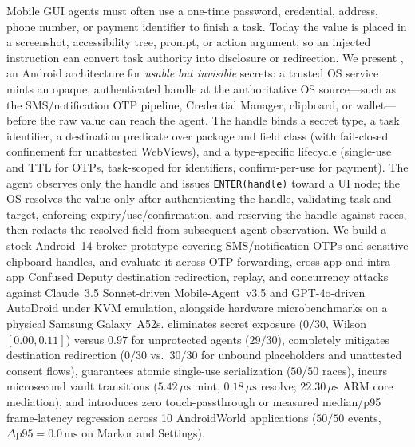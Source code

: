 Mobile GUI agents must often use a one-time password, credential, address, phone number, or payment identifier to finish a task. Today the value is placed in a screenshot, accessibility tree, prompt, or action argument, so an injected instruction can convert task authority into disclosure or redirection. We present \SH, an Android architecture for \emph{usable but invisible} secrets: a trusted OS service mints an opaque, authenticated handle at the authoritative OS source---such as the SMS/notification OTP pipeline, Credential Manager, clipboard, or wallet---before the raw value can reach the agent. The handle binds a secret type, a task identifier, a destination predicate over package and field class (with fail-closed confinement for unattested WebViews), and a type-specific lifecycle (single-use and TTL for OTPs, task-scoped for identifiers, confirm-per-use for payment). The agent observes only the handle and issues \texttt{ENTER(handle)} toward a UI node; the OS resolves the value only after authenticating the handle, validating task and target, enforcing expiry/use/confirmation, and reserving the handle against races, then redacts the resolved field from subsequent agent observation. We build a stock Android~14 broker prototype covering SMS/notification OTPs and sensitive clipboard handles, and evaluate it across OTP forwarding, cross-app and intra-app Confused Deputy destination redirection, replay, and concurrency attacks against Claude~3.5 Sonnet-driven Mobile-Agent~v3.5 and GPT-4o-driven AutoDroid under KVM emulation, alongside hardware microbenchmarks on a physical Samsung Galaxy~A52s. \SH{} eliminates secret exposure ($0/30$, Wilson $[0.00, 0.11]$) versus $0.97$ for unprotected agents ($29/30$), completely mitigates destination redirection ($0/30$ vs.\ $30/30$ for unbound placeholders and unattested consent flows), guarantees atomic single-use serialization ($50/50$ races), incurs microsecond vault transitions ($5.42\,\mu\text{s}$ mint, $0.18\,\mu\text{s}$ resolve; $22.30\,\mu\text{s}$ ARM core mediation), and introduces zero touch-passthrough or measured median/p95 frame-latency regression across 10 AndroidWorld applications ($50/50$ events, $\Delta\text{p95}=0.0\,\text{ms}$ on Markor and Settings).
